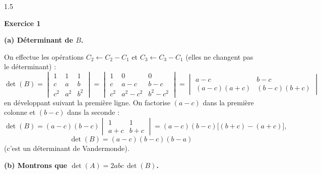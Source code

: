 \documentclass[12pt]{article}
\begin{document}
\begin{spacing}{1.5}

\textbf{Exercice 1}

\textbf{(a) Déterminant de $B$.}

On effectue les opérations $C_2\leftarrow C_2-C_1$ et $C_3\leftarrow C_3-C_1$ (elles ne changent pas le déterminant) :
\[
\det(B)=\begin{vmatrix}
1 & 1 & 1 \\
c & a & b \\
c^2 & a^2 & b^2
\end{vmatrix}
=\begin{vmatrix}
1 & 0 & 0 \\
c & a-c & b-c \\
c^2 & a^2-c^2 & b^2-c^2
\end{vmatrix}
=\begin{vmatrix}
a-c & b-c \\
(a-c)(a+c) & (b-c)(b+c)
\end{vmatrix}
\]
en développant suivant la première ligne. On factorise $(a-c)$ dans la première colonne et $(b-c)$ dans la seconde :
\[
\det(B)=(a-c)(b-c)\begin{vmatrix}
1 & 1 \\
a+c & b+c
\end{vmatrix}=(a-c)(b-c)\big[(b+c)-(a+c)\big],
\]
\[
\boxed{\det(B)=(a-c)(b-c)(b-a)}
\]
(c'est un déterminant de Vandermonde).

\textbf{(b) Montrons que $\det(A)=2abc\,\det(B)$.}


\end{spacing}
\end{document}
